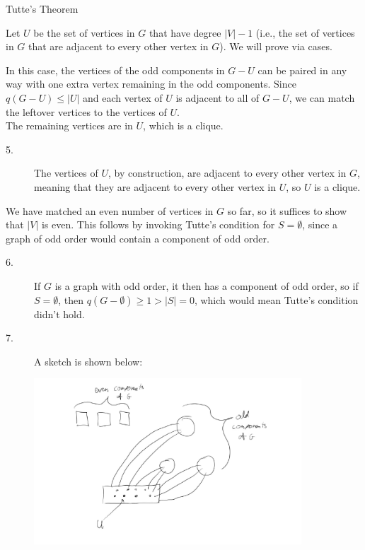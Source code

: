 \documentclass[10pt]{extarticle}
\begin{document}
{\begin{problem}{Tutte's Theorem}
\begin{description}[font=\scshape]
        Let $U$ be the set of vertices in $G$ that have degree $|V|-1$ (i.e., the set of vertices in $G$ that are adjacent to every other vertex in $G$). We will prove via cases.
        \begin{description}[font=\normalfont\scshape]
          \item[Case 1: $G-U$ consists of disjoint complete graphs.] In this case, the vertices of the odd components in $G-U$ can be paired in any way with one extra vertex remaining in the odd components. Since $q(G-U) \leq |U|$ and each vertex of $U$ is adjacent to all of $G-U$, we can match the leftover vertices to the vertices of $U$.\\

            The remaining vertices are in $U$, which is a clique.
            \begin{description}
              \item[5.] The vertices of $U$, by construction, are adjacent to every other vertex in $G$, meaning that they are adjacent to every other vertex in $U$, so $U$ is a clique.
            \end{description}
            We have matched an even number of vertices in $G$ so far, so it suffices to show that $|V|$ is even. This follows by invoking Tutte's condition for $S = \emptyset$, since a graph of odd order would contain a component of odd order.
            \begin{description}
              \item[6.] If $G$ is a graph with odd order, it then has a component of odd order, so if $S = \emptyset$,  then $q(G-\emptyset) \geq 1 > |S| = 0$, which would mean Tutte's condition didn't hold.
              \item[7.]A sketch is shown below:\\
                \begin{center}
                  \includegraphics[width=10cm]{tutte_condition_sketch}

\end{center}
\end{description}
\end{description}
\end{description}
\end{problem}}
\end{document}
